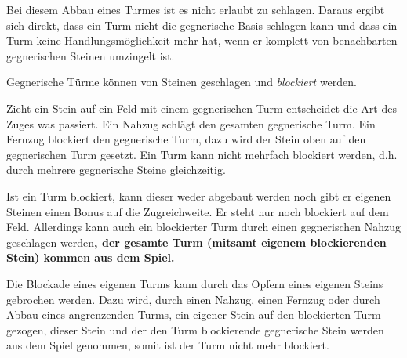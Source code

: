 Bei diesem Abbau eines Turmes ist es nicht erlaubt zu schlagen. Daraus ergibt sich direkt, dass ein Turm nicht die gegnerische Basis schlagen kann und dass ein Turm keine Handlungsmöglichkeit mehr hat, wenn er komplett von benachbarten gegnerischen Steinen umzingelt ist. 



\newpage 
Gegnerische Türme können von Steinen geschlagen und \emph{blockiert} werden. 

Zieht ein Stein auf ein Feld mit einem gegnerischen Turm entscheidet die Art des Zuges was passiert. Ein Nahzug schlägt den gesamten gegnerische Turm. Ein Fernzug blockiert den gegnerische Turm, dazu wird der Stein oben auf den gegnerischen Turm gesetzt. Ein Turm kann nicht mehrfach blockiert werden, d.h. durch mehrere gegnerische Steine gleichzeitig. 


Ist ein Turm blockiert, kann dieser weder abgebaut werden noch gibt er eigenen Steinen einen Bonus auf die Zugreichweite. Er steht nur noch blockiert auf dem Feld. Allerdings kann auch ein blockierter Turm durch einen gegnerischen Nahzug geschlagen werden\textbf{, der gesamte Turm (mitsamt eigenem blockierenden Stein) kommen aus dem Spiel.} \marginpar{\textbf{|}}


Die Blockade eines eigenen Turms kann durch das Opfern eines eigenen Steins
gebrochen werden. Dazu wird, durch einen Nahzug, einen Fernzug oder durch Abbau eines angrenzenden Turms, ein eigener Stein auf den blockierten Turm gezogen,
dieser Stein und der den Turm blockierende gegnerische Stein werden aus dem
Spiel genommen, somit ist der Turm nicht mehr blockiert. 

